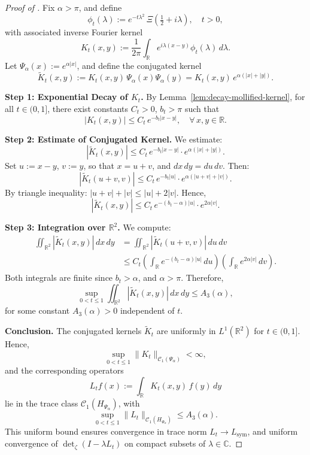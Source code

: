 \begin{proof}[Proof of ]
Fix \( \alpha > \pi \), and define
\[
\phi_t(\lambda) := e^{-t\lambda^2} \, \Xi\left( \tfrac{1}{2} + i\lambda \right), \quad t > 0,
\]
with associated inverse Fourier kernel
\[
K_t(x,y) := \frac{1}{2\pi} \int_{\mathbb{R}} e^{i\lambda(x - y)} \phi_t(\lambda)\, d\lambda.
\]
Let \( \Psi_\alpha(x) := e^{\alpha |x|} \), and define the conjugated kernel
\[
\widetilde{K}_t(x,y) := K_t(x,y)\, \Psi_\alpha(x)\Psi_\alpha(y) = K_t(x,y)\, e^{\alpha(|x| + |y|)}.
\]

\medskip
\noindent\textbf{Step 1: Exponential Decay of \( K_t \).}
By Lemma~\ref{lem:decay-mollified-kernel}, for all \( t \in (0,1] \), there exist constants \( C_t > 0 \), \( b_t > \pi \) such that
\[
|K_t(x,y)| \le C_t\, e^{-b_t |x - y|}, \quad \forall\, x, y \in \mathbb{R}.
\]

\medskip
\noindent\textbf{Step 2: Estimate of Conjugated Kernel.}
We estimate:
\[
|\widetilde{K}_t(x,y)| \le C_t\, e^{-b_t |x - y|} \cdot e^{\alpha(|x| + |y|)}.
\]
Set \( u := x - y \), \( v := y \), so that \( x = u + v \), and \( dx\,dy = du\,dv \). Then:
\[
|\widetilde{K}_t(u + v, v)| \le C_t\, e^{-b_t |u|} \cdot e^{\alpha(|u + v| + |v|)}.
\]
By triangle inequality: \( |u + v| + |v| \le |u| + 2|v| \). Hence,
\[
|\widetilde{K}_t(x,y)| \le C_t\, e^{-(b_t - \alpha)|u|} \cdot e^{2\alpha |v|}.
\]

\medskip
\noindent\textbf{Step 3: Integration over \( \mathbb{R}^2 \).}
We compute:
\[
\begin{aligned}
\iint_{\mathbb{R}^2} |\widetilde{K}_t(x,y)|\, dx\,dy
&= \iint_{\mathbb{R}^2} |\widetilde{K}_t(u + v, v)|\, du\,dv \\
&\le C_t \left( \int_{\mathbb{R}} e^{-(b_t - \alpha)|u|} \, du \right)
        \left( \int_{\mathbb{R}} e^{2\alpha |v|} \, dv \right).
\end{aligned}
\]
Both integrals are finite since \( b_t > \alpha \), and \( \alpha > \pi \). Therefore,
\[
\sup_{0 < t \le 1} \iint_{\mathbb{R}^2} |\widetilde{K}_t(x,y)|\, dx\,dy \le A_3(\alpha),
\]
for some constant \( A_3(\alpha) > 0 \) independent of \( t \).

\medskip
\noindent\textbf{Conclusion.}
The conjugated kernels \( \widetilde{K}_t \) are uniformly in \( L^1(\mathbb{R}^2) \) for \( t \in (0,1] \). Hence,
\[
\sup_{0 < t \le 1} \|K_t\|_{\mathcal{C}_1(\Psi_\alpha)} < \infty,
\]
and the corresponding operators
\[
L_t f(x) := \int_{\mathbb{R}} K_t(x,y)\, f(y)\, dy
\]
lie in the trace class \( \mathcal{C}_1(H_{\Psi_\alpha}) \), with
\[
\sup_{0 < t \le 1} \|L_t\|_{\mathcal{C}_1(H_{\Psi_\alpha})} \le A_3(\alpha).
\]
This uniform bound ensures convergence in trace norm \( L_t \to L_{\mathrm{sym}} \), and uniform convergence of \( \det_\zeta(I - \lambda L_t) \) on compact subsets of \( \lambda \in \mathbb{C} \).
\end{proof}
